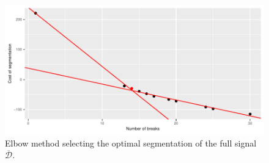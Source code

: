 
\begin{figure}[htbp]
  \centering
  \includegraphics[]{figs/Chap5/Elbow_seg-1.pdf}
  \caption{Elbow method selecting the optimal segmentation of the full signal $\overline{\mathcal{D}}$.}
  \label{fig:elb_seg}
\end{figure} 


